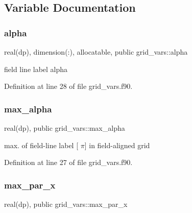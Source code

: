 \subsection{Variable Documentation}
\mbox{\label{namespacegrid__vars_a07bf4730be1d5ab8b42f85be63e11797}} 
\subsubsection{\texorpdfstring{alpha}{alpha}}
{\footnotesize\ttfamily real(dp), dimension(\+:), allocatable, public grid\+\_\+vars\+::alpha}



field line label alpha 



Definition at line 28 of file grid\+\_\+vars.\+f90.

\mbox{\label{namespacegrid__vars_ad3cab5cd1037b6956ccf74cde4539298}} 
\subsubsection{\texorpdfstring{max\+\_\+alpha}{max\_alpha}}
{\footnotesize\ttfamily real(dp), public grid\+\_\+vars\+::max\+\_\+alpha}



max. of field-\/line label \mbox{[} $\pi$\mbox{]} in field-\/aligned grid 



Definition at line 27 of file grid\+\_\+vars.\+f90.

\mbox{\label{namespacegrid__vars_acaa1fd21d0c728ad8f24591c0d2a5801}} 
\subsubsection{\texorpdfstring{max\+\_\+par\+\_\+x}{max\_par\_x}}
{\footnotesize\ttfamily real(dp), public grid\+\_\+vars\+::max\+\_\+par\+\_\+x}




